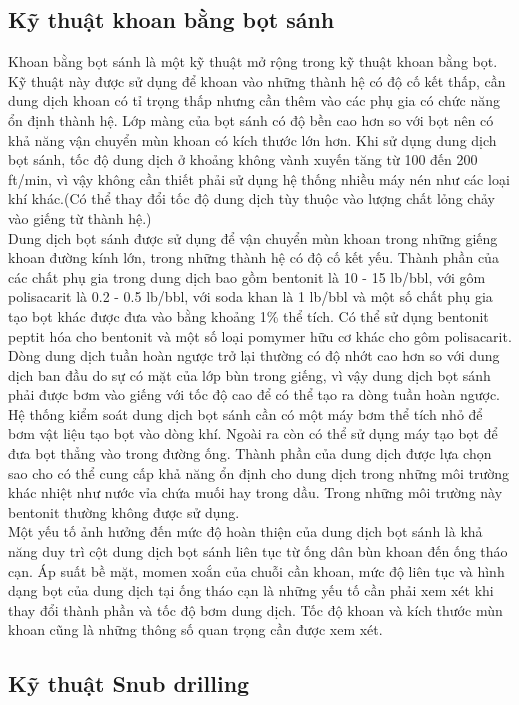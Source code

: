 \documentclass[12pt,a4paper]{article}
\begin{document}
\subsection{Kỹ thuật khoan bằng bọt sánh}
	Khoan bằng bọt sánh\cite{rehm2013underbalanced} là một kỹ thuật mở rộng trong kỹ thuật khoan bằng bọt. Kỹ thuật này được sử dụng để khoan vào những thành hệ có độ cố kết thấp, cần dung dịch khoan có tỉ trọng thấp nhưng cần thêm vào các phụ gia có chức năng ổn định thành hệ. Lớp màng của bọt sánh có độ bền cao hơn so với bọt nên có khả năng vận chuyển mùn khoan có kích thước lớn hơn. Khi sử dụng dung dịch bọt sánh, tốc độ dung dịch ở khoảng không vành xuyến tăng từ 100 đến 200 ft/min, vì vậy không cần thiết phải sử dụng hệ thống nhiều máy nén như các loại khí khác.(Có thể thay đổi tốc độ dung dịch tùy thuộc vào lượng chất lỏng chảy vào giếng từ thành hệ.)\\
	Dung dịch bọt sánh được sử dụng để vận chuyển mùn khoan trong những giếng khoan đường kính lớn, trong những thành hệ có độ cố kết yếu. Thành phần của các chất phụ gia trong dung dịch bao gồm bentonit là 10 - 15 lb/bbl, với gôm polisacarit là 0.2 - 0.5 lb/bbl, với soda khan là 1 lb/bbl và một số chất phụ gia tạo bọt khác được đưa vào bằng khoảng 1\% thể tích. Có thể sử dụng bentonit peptit hóa cho bentonit và một số loại pomymer hữu cơ khác cho gôm polisacarit. Dòng dung dịch tuần hoàn ngược trở lại thường có độ nhớt cao hơn so với dung dịch ban đầu do sự có mặt của lớp bùn trong giếng, vì vậy dung dịch bọt sánh phải được bơm vào giếng với tốc độ cao để có thể tạo ra dòng tuần hoàn ngược. \\
	Hệ thống kiểm soát dung dịch bọt sánh cần có một máy bơm thể tích nhỏ để bơm vật liệu tạo bọt vào dòng khí. Ngoài ra còn có thể sử dụng máy tạo bọt để đưa bọt thẳng vào trong đường ống. Thành phần của dung dịch được lựa chọn sao cho có thể cung cấp khả năng ổn định cho dung dịch trong những môi trường khác nhiệt như nước vỉa chứa muối hay trong dầu. Trong những môi trường này bentonit thường không được sử dụng.\\
	Một yếu tố ảnh hưởng đến mức độ hoàn thiện của dung dịch bọt sánh là khả năng duy trì cột dung dịch bọt sánh liên tục từ ống dân bùn khoan đến ống tháo cạn. Áp suất bề mặt, momen xoắn của chuỗi cần khoan, mức độ liên tục và hình dạng bọt của dung dịch tại ống tháo cạn là những yếu tố cần phải xem xét khi thay đổi thành phần và tốc độ bơm dung dịch. Tốc độ khoan và kích thước mùn khoan cũng là những thông số quan trọng cần được xem xét.
\subsection{Kỹ thuật Snub drilling}
\end{document}
